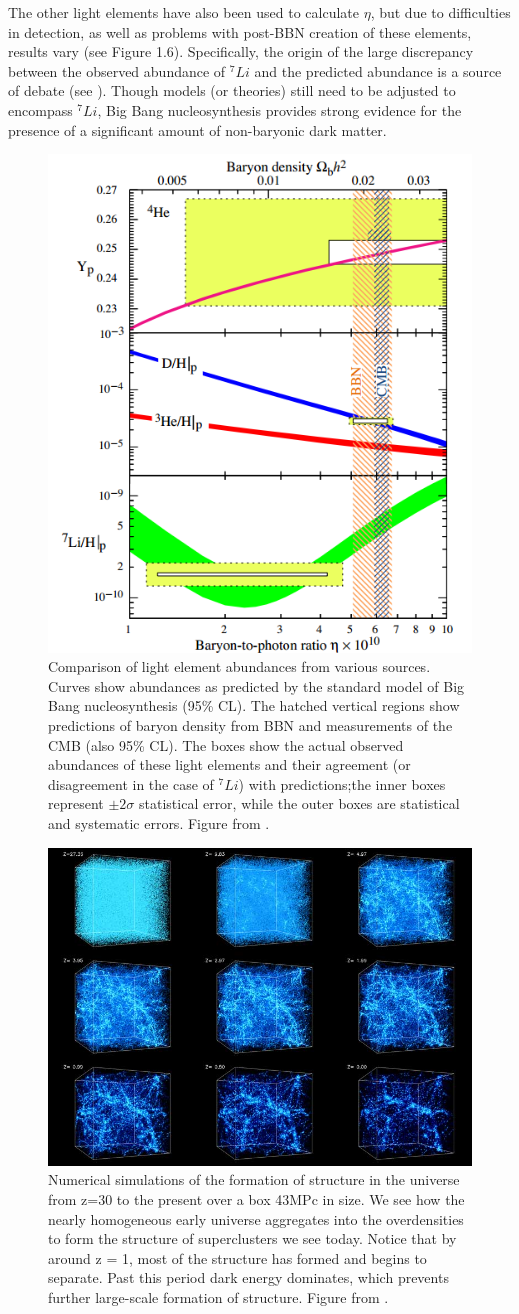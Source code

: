\documentclass{report}
\begin{document}
The other light elements have also been used to calculate $\eta$, but due to difficulties in detection, as well as problems with post-BBN creation of these elements, results vary (see Figure 1.6). Specifically, the origin of the large discrepancy between the observed abundance of $^7Li$ and the predicted abundance is a source of debate (see \cite{Amsler2008}). Though models (or theories) still need to be adjusted to encompass $^7Li$, Big Bang nucleosynthesis provides strong evidence for the presence of a significant amount of non-baryonic dark matter.

\begin{figure}
\centering
\includegraphics[width = .4\textwidth]{Deuterium.png}
\caption{Comparison of light element abundances from various sources. Curves show abundances as predicted by the standard model of Big Bang nucleosynthesis \cite{Cyburt2008} (95\% CL). The hatched vertical regions show predictions of baryon density from BBN and measurements of the CMB (also 95\% CL). The boxes show the actual observed abundances of these light elements and their agreement (or disagreement in the case of $^7Li$) with predictions;the inner boxes represent $\pm2\sigma$ statistical error, while the outer boxes are statistical and systematic errors. Figure from \cite{Amsler2008}.}
\end{figure}

\begin{figure}
\centering
\includegraphics[width = .5\textwidth]{structure_formation.jpg}
\caption{Numerical simulations of the formation of structure in the universe from z=30 to the present over a box 43MPc in size. We see how the nearly homogeneous early universe aggregates into the overdensities to form the structure of superclusters we see today. Notice that by around z = 1, most of the structure has formed and begins to separate. Past this period dark energy dominates, which prevents further large-scale formation of structure. Figure from \cite{Simulation}.}
\end{figure}
\end{document}
